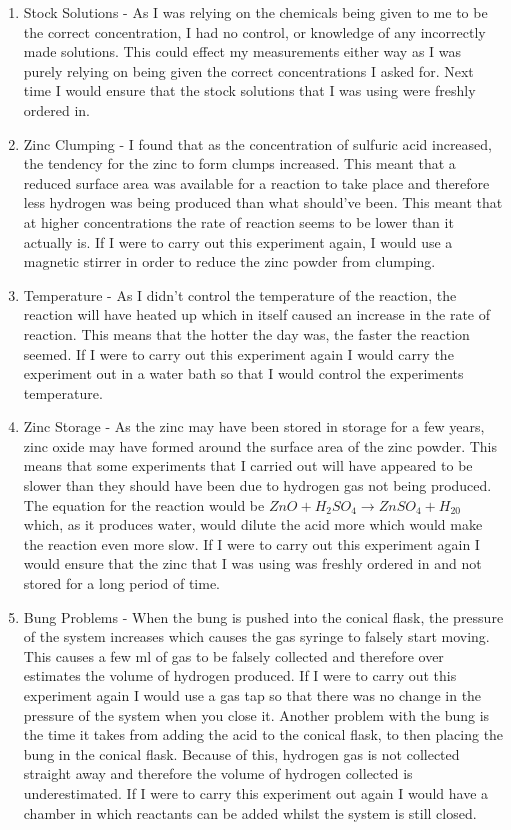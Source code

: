 \begin{enumerate}
\item Stock Solutions - As I was relying on the chemicals being given to me to be the correct concentration, I had no control, or knowledge of any incorrectly made solutions. This could effect my measurements either way as I was purely relying on being given the correct concentrations I asked for. Next time I would ensure that the stock solutions that I was using were freshly ordered in.

\item Zinc Clumping - I found that as the concentration of sulfuric acid increased, the tendency for the zinc to form clumps increased. This meant that a reduced surface area was available for a reaction to take place and therefore less hydrogen was being produced than what should've been. This meant that at higher concentrations the rate of reaction seems to be lower than it actually is. If I were to carry out this experiment again, I would use a magnetic stirrer in order to reduce the zinc powder from clumping.

\item Temperature - As I didn't control the temperature of the reaction, the reaction will have heated up which in itself caused an increase in the rate of reaction. This means that the hotter the day was, the faster the reaction seemed. If I were to carry out this experiment again I would carry the experiment out in a water bath so that I would control the experiments temperature.

\item Zinc Storage - As the zinc may have been stored in storage for a few years, zinc oxide may have formed around the surface area of the zinc powder. This means that some experiments that I carried out will have appeared to be slower than they should have been due to hydrogen gas not being produced. The equation for the reaction would be $ZnO + H_2SO_4 \rightarrow ZnSO_4 + H_20$ which, as it produces water, would dilute the acid more which would make the reaction even more slow. If I were to carry out this experiment again I would ensure that the zinc that I was using was freshly ordered in and not stored for a long period of time.

\item Bung Problems - When the bung is pushed into the conical flask, the pressure of the system increases which causes the gas syringe to falsely start moving. This causes a few ml of gas to be falsely collected and therefore over estimates the volume of hydrogen produced. If I were to carry out this experiment again I would use a gas tap so that there was no change in the pressure of the system when you close it. Another problem with the bung is the time it takes from adding the acid to the conical flask, to then placing the bung in the conical flask. Because of this, hydrogen gas is not collected straight away and therefore the volume of hydrogen collected is underestimated. If I were to carry this experiment out again I would have a chamber in which reactants can be added whilst the system is still closed.
\end{enumerate}